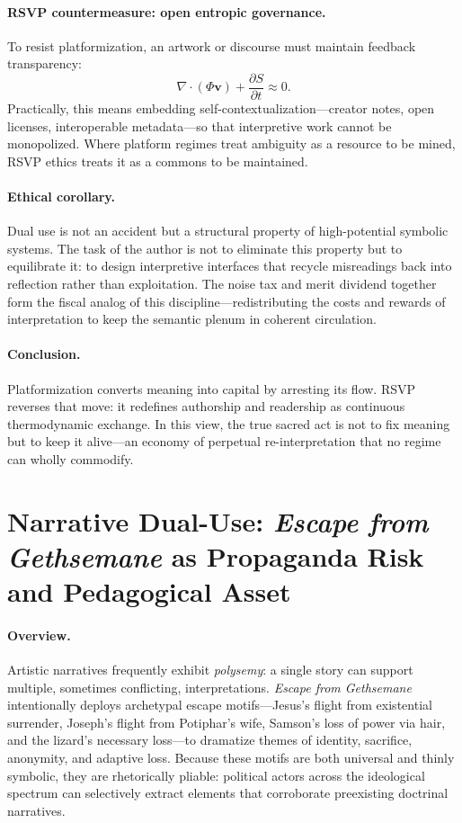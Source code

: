 \documentclass[12pt]{article}
\begin{document}
\paragraph{RSVP countermeasure: open entropic governance.}
To resist platformization, an artwork or discourse must maintain feedback transparency:
\[
\nabla\!\cdot(\Phi\mathbf{v}) + \frac{\partial S}{\partial t} \approx 0.
\]
Practically, this means embedding self-contextualization—creator notes, open licenses, interoperable metadata—so that interpretive work cannot be monopolized.  
Where platform regimes treat ambiguity as a resource to be mined, RSVP ethics treats it as a commons to be maintained.

\paragraph{Ethical corollary.}
Dual use is not an accident but a structural property of high-potential symbolic systems.  
The task of the author is not to eliminate this property but to equilibrate it: to design interpretive interfaces that recycle misreadings back into reflection rather than exploitation.  
The noise tax and merit dividend together form the fiscal analog of this discipline—redistributing the costs and rewards of interpretation to keep the semantic plenum in coherent circulation.

\paragraph{Conclusion.}
Platformization converts meaning into capital by arresting its flow.  
RSVP reverses that move: it redefines authorship and readership as continuous thermodynamic exchange.  
In this view, the true sacred act is not to fix meaning but to keep it alive—an economy of perpetual re-interpretation that no regime can wholly commodify.

\section{Narrative Dual-Use: \emph{Escape from Gethsemane} as Propaganda Risk and Pedagogical Asset}
\label{sec:dual-use-screenplay}

\paragraph{Overview.}
Artistic narratives frequently exhibit \emph{polysemy}: a single story can support multiple, sometimes conflicting, interpretations.  
\emph{Escape from Gethsemane} intentionally deploys archetypal escape motifs—Jesus’s flight from existential surrender, Joseph’s flight from Potiphar’s wife, Samson’s loss of power via hair, and the lizard’s necessary loss—to dramatize themes of identity, sacrifice, anonymity, and adaptive loss.  
Because these motifs are both universal and thinly symbolic, they are rhetorically pliable: political actors across the ideological spectrum can selectively extract elements that corroborate preexisting doctrinal narratives.
\end{document}
